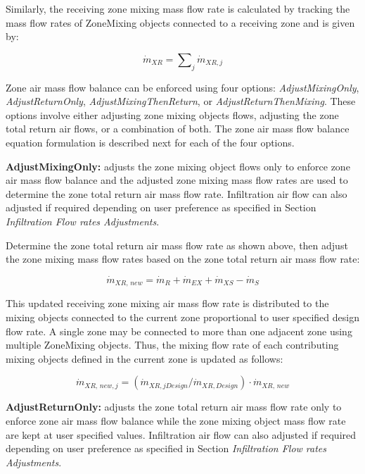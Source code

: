 Similarly, the receiving zone mixing mass flow rate is calculated by tracking the mass flow rates of ZoneMixing objects connected to a receiving zone and is given by:

\begin{equation}
{\dot m_{XR}} = \sum\nolimits_j {{{\dot m}_{XR,j}}}
\end{equation}

Zone air mass flow balance can be enforced using four options: \textit{AdjustMixingOnly}, \textit{AdjustReturnOnly}, \textit{AdjustMixingThenReturn}, or \textit{AdjustReturnThenMixing}.  These options involve either adjusting zone mixing objects flows, adjusting the zone total return air flows, or a 
combination of both. The zone air mass flow balance equation formulation is described next for each of the four options.

\textbf{AdjustMixingOnly:} adjusts the zone mixing object flows only to enforce zone air mass flow balance and the adjusted zone mixing mass flow rates are used to determine the zone total return air mass flow rate. Infiltration air flow can also adjusted if required depending on user preference as specified in Section \textit{Infiltration Flow rates Adjustments}.

Determine the zone total return air mass flow rate as shown above, then adjust the zone mixing mass flow rates based on the zone total return air mass flow rate:

\begin{equation}
{\dot m_{XR,\,new}} = {\dot m_R} + {\dot m_{EX}} + {\dot m_{XS}} - {\dot m_S}
\end{equation}

This updated receiving zone mixing air mass flow rate is distributed to the mixing objects connected to the current zone proportional to user specified design flow rate. A single zone may be connected to more than one adjacent zone using multiple ZoneMixing objects. Thus, the mixing flow rate of each contributing mixing objects defined in the current zone is updated as follows:

\begin{equation}
{\dot m_{XR,\,new,j}} = \left( {{{\dot m}_{XR,jDesign}}/{{\dot m}_{XR,Design}}} \right) \cdot {\dot m_{XR,\,new}}
\end{equation}

\textbf{AdjustReturnOnly:} adjusts the zone total return air mass flow rate only to enforce zone air mass flow balance while the zone mixing object mass flow rate are kept at user specified values. Infiltration air flow can also adjusted if required depending on user preference as specified in Section \textit{Infiltration Flow rates Adjustments}.


